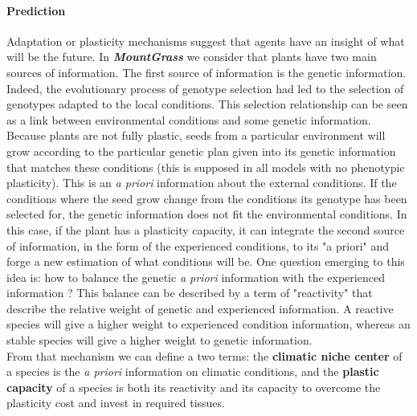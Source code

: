 \documentclass[a4paper,twoside, justified,marginals=raggedright]{tufte-handout}
\newcommand{\model}{\textit{\textbf{MountGrass }}}
\begin{document}
\paragraph{Prediction} Adaptation or plasticity mechanisms suggest that agents have an insight of what will be the future. In \model we consider that plants have two main sources of information. The first source of information is the genetic information. Indeed, the evolutionary process of genotype selection had led to the selection of genotypes adapted to the local conditions. This selection relationship can be seen as a link between environmental conditions and some genetic information. Because plants are not fully plastic, seeds from a particular environment will grow according to the particular genetic plan given into its genetic information that matches these conditions (this is supposed in all models with no phenotypic plasticity). This is an \textit{a priori} information about the external conditions. If the conditions where the seed grow change from the conditions its genotype has been selected for, the genetic information does not fit the environmental conditions. In this case, if the plant has a plasticity capacity, it can integrate the second source of information, in the form of the experienced conditions, to its "a priori" and forge a new estimation of what conditions will be. One question emerging to this idea is: how to balance the genetic \textit{a priori} information with the experienced information ? This balance can be described by a term of "reactivity" that describe the relative weight of genetic and experienced information. A reactive species will give a higher weight to experienced condition information, whereas an stable species will give a higher weight to genetic information.\\
\indent From that mechanism we can define a two terms: the \textbf{climatic niche center} of a species is the \textit{a priori} information on climatic conditions, and the \textbf{plastic capacity} of a species is both its reactivity and its capacity to overcome the plasticity cost and invest in required tissues.

\end{document}
